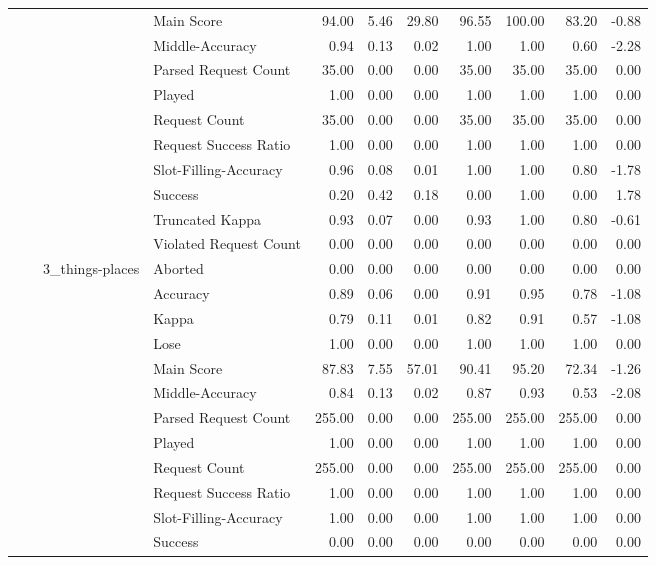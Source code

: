 \begin{tabular}{llllrrrrrrr}
 &  &  & Main Score & 94.00 & 5.46 & 29.80 & 96.55 & 100.00 & 83.20 & -0.88 \\
 &  &  & Middle-Accuracy & 0.94 & 0.13 & 0.02 & 1.00 & 1.00 & 0.60 & -2.28 \\
 &  &  & Parsed Request Count & 35.00 & 0.00 & 0.00 & 35.00 & 35.00 & 35.00 & 0.00 \\
 &  &  & Played & 1.00 & 0.00 & 0.00 & 1.00 & 1.00 & 1.00 & 0.00 \\
 &  &  & Request Count & 35.00 & 0.00 & 0.00 & 35.00 & 35.00 & 35.00 & 0.00 \\
 &  &  & Request Success Ratio & 1.00 & 0.00 & 0.00 & 1.00 & 1.00 & 1.00 & 0.00 \\
 &  &  & Slot-Filling-Accuracy & 0.96 & 0.08 & 0.01 & 1.00 & 1.00 & 0.80 & -1.78 \\
 &  &  & Success & 0.20 & 0.42 & 0.18 & 0.00 & 1.00 & 0.00 & 1.78 \\
 &  &  & Truncated Kappa & 0.93 & 0.07 & 0.00 & 0.93 & 1.00 & 0.80 & -0.61 \\
 &  &  & Violated Request Count & 0.00 & 0.00 & 0.00 & 0.00 & 0.00 & 0.00 & 0.00 \\
\cline{3-11}
 &  & \multirow[t]{14}{*}{3_things-places} & Aborted & 0.00 & 0.00 & 0.00 & 0.00 & 0.00 & 0.00 & 0.00 \\
 &  &  & Accuracy & 0.89 & 0.06 & 0.00 & 0.91 & 0.95 & 0.78 & -1.08 \\
 &  &  & Kappa & 0.79 & 0.11 & 0.01 & 0.82 & 0.91 & 0.57 & -1.08 \\
 &  &  & Lose & 1.00 & 0.00 & 0.00 & 1.00 & 1.00 & 1.00 & 0.00 \\
 &  &  & Main Score & 87.83 & 7.55 & 57.01 & 90.41 & 95.20 & 72.34 & -1.26 \\
 &  &  & Middle-Accuracy & 0.84 & 0.13 & 0.02 & 0.87 & 0.93 & 0.53 & -2.08 \\
 &  &  & Parsed Request Count & 255.00 & 0.00 & 0.00 & 255.00 & 255.00 & 255.00 & 0.00 \\
 &  &  & Played & 1.00 & 0.00 & 0.00 & 1.00 & 1.00 & 1.00 & 0.00 \\
 &  &  & Request Count & 255.00 & 0.00 & 0.00 & 255.00 & 255.00 & 255.00 & 0.00 \\
 &  &  & Request Success Ratio & 1.00 & 0.00 & 0.00 & 1.00 & 1.00 & 1.00 & 0.00 \\
 &  &  & Slot-Filling-Accuracy & 1.00 & 0.00 & 0.00 & 1.00 & 1.00 & 1.00 & 0.00 \\
 &  &  & Success & 0.00 & 0.00 & 0.00 & 0.00 & 0.00 & 0.00 & 0.00 \\

\end{tabular}
